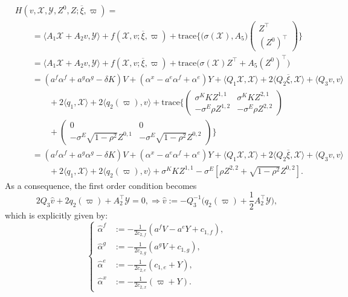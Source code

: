\documentclass[10pt,a4paper]{amsart}
\numberwithin{equation}{section}
\newcommand{\w}{\varpi}
\renewcommand{\bar}{\overline}
\begin{document}
\begin{align*}
&H(v,\mathcal{X}, \mathcal{Y},Z^0,Z;\bar{\xi},\w)= \\
&\qquad =  \langle A_1 \mathcal{X} + A_2v,\mathcal{Y}\rangle + f(\mathcal{X}, v; \bar{\xi}, \w)	+ \text{trace}\bigg\{\bigg( \sigma(\mathcal{X}),A_5\bigg)\begin{pmatrix}
    Z^\top\\
    (Z^0)^\top\end{pmatrix}\bigg\}\\
&\qquad= \langle A_1 \mathcal{X} + A_2v,\mathcal{Y}\rangle + f(\mathcal{X}, v; \bar{\xi}, \w)	+ \text{trace}\bigg( \sigma( \mathcal{X} ) Z^\top +  A_5(Z^0)^\top\bigg) 	\\
&\qquad= (a^f\alpha^{f} + a^g\alpha^{g}- \delta K)V + (\alpha^x -a^e\alpha^f + \alpha^e) Y + \langle Q_1 \mathcal{X} ,\mathcal{X}\rangle+ 2\langle Q_2\overline{\xi}, \mathcal{X}\rangle + \langle Q_3 v, v\rangle  \\
&\qquad\qquad+2\langle q_1, \mathcal{X}\rangle + 2 \langle q_2(\w),v\rangle + \text{trace}\bigg\{ 
\begin{pmatrix}
    \sigma^K K Z^{1,1} & \sigma^K K Z^{2,1}\\
    -\sigma^E \rho Z^{1,2} & -\sigma^E \rho Z^{2,2} 
\end{pmatrix} \\
&\qquad\qquad+ 
\begin{pmatrix}
    0&0\\
    -\sigma^E\sqrt{1-\rho^2}Z^{0,1}&-\sigma^E\sqrt{1-\rho^2}Z^{0,2}
\end{pmatrix}\bigg\}\\ 
&\qquad = (a^f\alpha^{f} + a^g\alpha^{g}- \delta K)V + (\alpha^x -a^e\alpha^f + \alpha^e) Y + \langle Q_1 \mathcal{X} ,\mathcal{X}\rangle+ 2\langle Q_2\overline{\xi}, \mathcal{X}\rangle + \langle Q_3 v, v\rangle  \\
&\qquad\qquad+2\langle q_1, \mathcal{X}\rangle + 2 \langle q_2(\w),v\rangle + \sigma^KKZ^{1,1} - \sigma^E [ \rho Z^{2,2} + \sqrt{1-\rho^2} Z^{0,2}].
\end{align*}
As a consequence, the first order condition becomes
\begin{equation}
\label{eqn: optimal control}
2Q_3 \widehat{v} + 2q_2(\w)+ A_2^\top \mathcal{Y}= 0,\Longrightarrow \widehat{v}:= -Q_3^{-1} \bigg(q_2(\w)+\frac{1}{2}A_2^\top \mathcal{Y}\bigg), 
\end{equation}
which is explicitly given by:
\begin{equation}
\label{eqn: FOC} 
\begin{cases}
\widehat{\alpha}^f &:= -\frac{1}{2c_{2,f}}(a^fV -a^eY + c_{1,f}),\\
\widehat{\alpha}^g &:=-\frac{1}{2c_{2,g}}(a^gV + c_{1,g}),\\
\widehat{\alpha}^e&:= -\frac{1}{2c_{2,e}}(c_{1,e} + Y),\\
\widehat{\alpha}^x&:= -\frac{1}{2c_{2,x}}(\w + Y).
\end{cases}
\end{equation}
\end{document}
